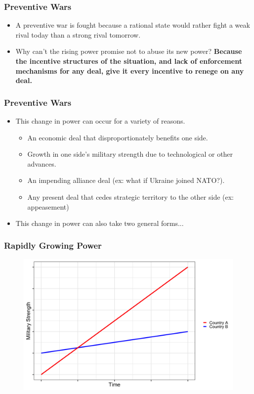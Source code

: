 \documentclass[handout]{beamer}
\begin{document}
\begin{frame} 
	\frametitle{\LARGE{Preventive Wars}}
	\begin{itemize}
		\item A preventive war is fought because a rational state would rather fight a weak rival today than a strong rival tomorrow. \pause
		\item Why can't the rising power promise not to abuse its new power? \pause \textbf{Because the incentive structures of the situation, and lack of enforcement mechanisms for any deal, give it every incentive to renege on any deal.}
	\end{itemize}
\end{frame}

\begin{frame} 
	\frametitle{\LARGE{Preventive Wars}}
	\begin{itemize}
		\item This change in power can occur for a variety of reasons. \pause
		\begin{itemize}
			\item An economic deal that disproportionately benefits one side. \pause
			\item Growth in one side's military strength due to technological or other advances. \pause
			\item An impending alliance deal (ex: what if Ukraine joined NATO?). \pause
			\item Any present deal that cedes strategic territory to the other side (ex: appeasement)
		\end{itemize}
		\item This change in power can also take two general forms...
	\end{itemize}
\end{frame}

\begin{frame} 
	\frametitle{\LARGE{Rapidly Growing Power}}
	\begin{figure}[ht!]
		\centering
		\includegraphics[height=.85\textheight, keepaspectratio]{./rapid_growth.png}
	\end{figure}
\end{frame}
\end{document}
